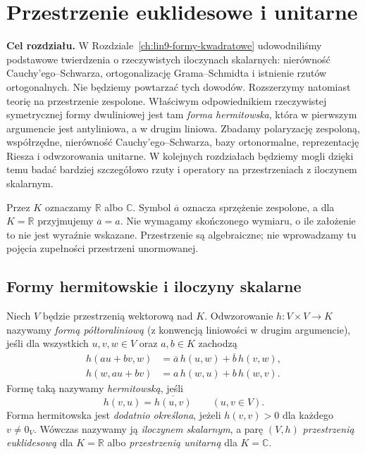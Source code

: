 \chapter{Przestrzenie euklidesowe i unitarne}
\label{ch:lin12-euklidesowe-unitarne}

\providecommand{\atlasref}[2]{#2}

\noindent\textbf{Cel rozdziału.}
W Rozdziale~\ref{ch:lin9-formy-kwadratowe} udowodniliśmy
podstawowe twierdzenia o rzeczywistych iloczynach skalarnych:
nierówność Cauchy'ego--Schwarza, ortogonalizację
Grama--Schmidta i istnienie rzutów ortogonalnych.
Nie będziemy powtarzać tych dowodów.
Rozszerzymy natomiast teorię na przestrzenie zespolone.
Właściwym odpowiednikiem rzeczywistej symetrycznej formy
dwuliniowej jest tam \emph{forma hermitowska}, która
w pierwszym argumencie jest antyliniowa,
a w drugim liniowa. Zbadamy polaryzację zespoloną,
współrzędne, nierówność Cauchy'ego--Schwarza,
bazy ortonormalne, reprezentację Riesza i
odwzorowania unitarne. W kolejnych rozdziałach
będziemy mogli dzięki temu badać bardziej szczegółowo
rzuty i operatory na przestrzeniach z iloczynem skalarnym.

Przez \(K\) oznaczamy \(\mathbb R\) albo \(\mathbb C\).
Symbol \(\overline a\) oznacza sprzężenie zespolone,
a dla \(K=\mathbb R\) przyjmujemy \(\overline a=a\).
Nie wymagamy skończonego wymiaru, o ile założenie
to nie jest wyraźnie wskazane. Przestrzenie są
algebraiczne; nie wprowadzamy tu pojęcia zupełności
przestrzeni unormowanej.

\section{Formy hermitowskie i iloczyny skalarne}
\label{sec:lin12-hermitowskie}

\begin{definicja}
\label{def:lin12-hermitowska}
Niech \(V\) będzie przestrzenią wektorową nad \(K\).
Odwzorowanie \(h\colon V\times V\to K\)
nazywamy \emph{formą półtoraliniową}
(z konwencją liniowości w drugim argumencie),
jeśli dla wszystkich \(u,v,w\in V\)
oraz \(a,b\in K\) zachodzą
\[
 \begin{aligned}
 h(au+bv,w)&=\overline a\,h(u,w)+
              \overline b\,h(v,w),\\
 h(w,au+bv)&=a\,h(w,u)+b\,h(w,v).
 \end{aligned}
\]
Formę taką nazywamy \emph{hermitowską}, jeśli
\[
 h(v,u)=\overline{h(u,v)}
 \qquad(u,v\in V).
\]
Forma hermitowska jest \emph{dodatnio określona},
jeżeli \(h(v,v)>0\) dla każdego \(v\ne0_V\).
Wówczas nazywamy ją \emph{iloczynem skalarnym},
a parę \((V,h)\) \emph{przestrzenią euklidesową}
dla \(K=\mathbb R\) albo \emph{przestrzenią unitarną}
dla \(K=\mathbb C\).
\end{definicja}

